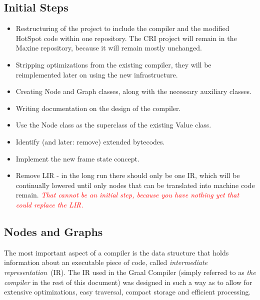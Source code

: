 \documentclass[twocolumn]{svjour3}
\newcommand{\mynote}[2]{
\textcolor{red}{\fbox{\bfseries\sffamily\scriptsize#1}
  {\small\textsf{\emph{#2}}}
\fbox{\bfseries\sffamily\scriptsize }}}
\newcommand\cw[1]{\mynote{CW}{#1}}
\begin{document}
\subsection{Initial Steps}
\begin{itemize}
    \item Restructuring of the project to include the compiler and the modified HotSpot code within one repository. The CRI project will remain in the Maxine repository, because it will remain mostly unchanged.
    \item Stripping optimizations from the existing compiler, they will be reimplemented later on using the new infrastructure.
    \item Creating Node and Graph classes, along with the necessary auxiliary classes.
    \item Writing documentation on the design of the compiler.
    \item Use the Node class as the superclass of the existing Value class.
    \item Identify (and later: remove) extended bytecodes.
    \item Implement the new frame state concept.
    \item Remove LIR - in the long run there should only be one IR, which will be continually lowered until only nodes that can be translated into machine code remain. \cw{That cannot be an initial step, because you have nothing yet that could replace the LIR.}
\end{itemize}

\subsection{Nodes and Graphs}
The most important aspect of a compiler is the data structure that holds information about an executable piece of code, called \emph{intermediate representation}~(IR).
The IR used in the Graal Compiler (simply referred to as \emph{the compiler} in the rest of this document) was designed in such a way as to allow for extensive optimizations, easy traversal, compact storage and efficient processing.
\end{document}
